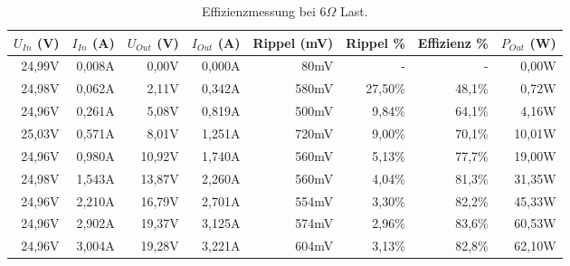 \begin{table}[h]
\centering
\begin{tabular}{|r|r|r|r|r|r|r|r|}
\hline
$U_{In}$ (V) & $I_{In}$ (A) & $U_{Out}$ (V) & $I_{Out}$ (A) & Rippel (mV) & Rippel \% & Effizienz \% & $P_{Out}$ (W) \\ \hline
24,99V   & 0,008A   & 0,00V        & 0,000A        & 80mV          & -         & -            & 0,00W      \\ \hline
24,98V   & 0,062A    & 2,11V    & 0,342A    & 580mV         & 27,50\%     & 48,1\%         & 0,72W   \\ \hline
24,96V   & 0,261A    & 5,08V    & 0,819A    & 500mV         & 9,84\%      & 64,1\%         & 4,16W   \\ \hline
25,03V   & 0,571A    & 8,01V        & 1,251A    & 720mV         & 9,00\%      & 70,1\%         & 10,01W  \\ \hline
24,96V   & 0,980A    & 10,92V    & 1,740A     & 560mV         & 5,13\%      & 77,7\%         & 19,00W  \\ \hline
24,98V   & 1,543A   & 13,87V    & 2,260A     & 560mV         & 4,04\%      & 81,3\%         & 31,35W  \\ \hline
24,96V   & 2,210A    & 16,79V    & 2,701A      & 554mV         & 3,30\%      & 82,2\%         & 45,33W  \\ \hline
24,96V   & 2,902A   & 19,37V    & 3,125A    & 574mV         & 2,96\%      & 83,6\%         & 60,53W  \\ \hline
24,96V   & 3,004A   & 19,28V    & 3,221A    & 604mV         & 3,13\%      & 82,8\%         & 62,10W  \\ \hline
\end{tabular}
\caption{Effizienzmessung bei 6$\Omega$ Last.}
\label{fig::Res6}
\end{table}

